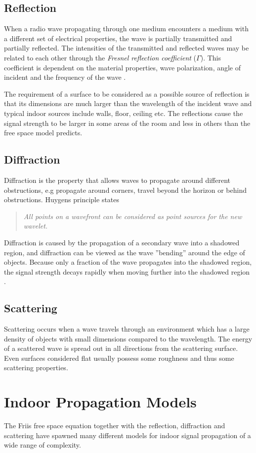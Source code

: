 \documentclass{LTHthesis}
\begin{document}
\subsection{Reflection}
%
When a radio wave propagating through one medium encounters a medium with a different set of electrical properties, the wave is partially transmitted and partially reflected. The intensities of the transmitted and reflected waves may be related to each other through the \emph{Fresnel reflection coefficient} ($\Gamma$). This coefficient is dependent on the material properties, wave polarization, angle of incident and the frequency of the wave \cite{rappaport96}.

The requirement of a surface to be considered as a possible source of reflection is that its dimensions are much larger than the wavelength of the incident wave and typical indoor sources include walls, floor, ceiling etc. The reflections cause the signal strength to be larger in some areas of the room and less in others than the free space model predicts.
%
\subsection{Diffraction}
%
Diffraction is the property that allows waves to propagate around different obstructions, e.g propagate  around corners, travel beyond the horizon or behind obstructions. Huygens principle states 
\begin{quote}
 \emph{All points on a wavefront can be considered as point sources for the new wavelet.} \cite{rappaport96}
 \end{quote}
%
Diffraction is caused by the propagation of a secondary wave into a shadowed region, and diffraction can be viewed as the wave ''bending'' around the edge of objects. Because only a fraction of the wave propagates into the shadowed region, the signal strength decays rapidly when moving further into the shadowed region \cite{rappaport96}.
%
\subsection{Scattering}
%
Scattering occurs when a wave travels through an environment which has a large density of objects with small dimensions compared to the wavelength. The energy of a scattered wave is spread out in all directions from the scattering surface. Even surfaces considered flat usually possess some roughness and thus some scattering properties.
%
\section{Indoor Propagation Models}
%
The Friis free space equation together with the reflection, diffraction and scattering have spawned many different models for indoor signal propagation of a wide range of complexity.
%
\end{document}
